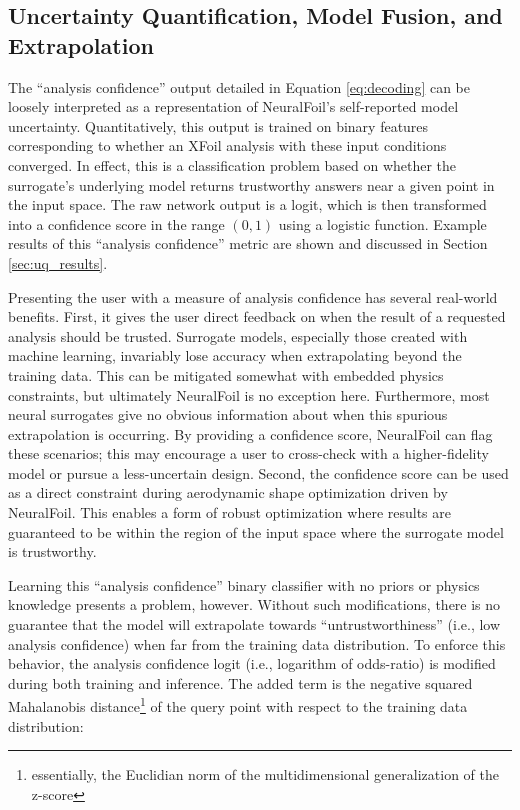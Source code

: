 \documentclass[journal]{new-aiaa}
\begin{document}
\subsection{Uncertainty Quantification, Model Fusion, and Extrapolation}
\label{sec:uq}

The ``analysis confidence'' output detailed in Equation \ref{eq:decoding} can be loosely interpreted as a representation of NeuralFoil's self-reported model uncertainty. Quantitatively, this output is trained on binary features corresponding to whether an XFoil analysis with these input conditions converged. In effect, this is a classification problem based on whether the surrogate's underlying model returns trustworthy answers near a given point in the input space. The raw network output is a logit, which is then transformed into a confidence score in the range $(0, 1)$ using a logistic function. Example results of this ``analysis confidence'' metric are shown and discussed in Section \ref{sec:uq_results}.

Presenting the user with a measure of analysis confidence has several real-world benefits. First, it gives the user direct feedback on when the result of a requested analysis should be trusted. Surrogate models, especially those created with machine learning, invariably lose accuracy when extrapolating beyond the training data. This can be mitigated somewhat with embedded physics constraints, but ultimately NeuralFoil is no exception here. Furthermore, most neural surrogates give no obvious information about when this spurious extrapolation is occurring. By providing a confidence score, NeuralFoil can flag these scenarios; this may encourage a user to cross-check with a higher-fidelity model or pursue a less-uncertain design. Second, the confidence score can be used as a direct constraint during aerodynamic shape optimization driven by NeuralFoil. This enables a form of robust optimization where results are guaranteed to be within the region of the input space where the surrogate model is trustworthy.

Learning this ``analysis confidence'' binary classifier with no priors or physics knowledge presents a problem, however. Without such modifications, there is no guarantee that the model will extrapolate towards ``untrustworthiness'' (i.e., low analysis confidence) when far from the training data distribution. To enforce this behavior, the analysis confidence logit (i.e., logarithm of odds-ratio) is modified during both training and inference. The added term is the negative squared Mahalanobis distance\footnote{essentially, the Euclidian norm of the multidimensional generalization of the z-score} of the query point with respect to the training data distribution:
\end{document}
